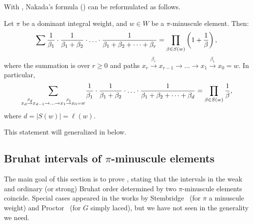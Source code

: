 With , Nakada's formula () can be reformulated as follows.
\begin{theorem}[Nakada]\label{thm:anotherform}
	Let $\pi$ be a dominant integral weight, and $w\in W$ be a $\pi$-minuscule element. Then: 
	\[ \sum \frac{1}{\beta_1}\cdot \frac{1}{\beta_1+\beta_2}\cdot \ldots \cdot\frac{1}{\beta_1+\beta_2+\cdots +\beta_r}
	=\prod_{\beta\in S(w)}\left(1+\frac{1}{\beta}\right) \/,
	\] where the summation is over $r \ge 0$ and paths $x_r\overset{\beta_r}{\to} x_{r-1}\to \ldots \to x_1\overset{\beta_1}{\to} x_0=w$.
	In particular, 
	$$
	{\sum_{x_d\overset{\beta_d}{\to} x_{d-1}\to \ldots \to x_1\overset{\beta_1}{\to} x_0=w\/}}
	\frac{1}{\beta_1}\cdot \frac{1}{\beta_1+\beta_2}\cdot \ldots \cdot \frac{1}{\beta_1+\beta_2+\cdots +\beta_d}
	=\prod_{\beta\in S(w)}\frac{1}{\beta},
	$$
	where $d=|S(w)|{= \ell(w)}$.
\end{theorem}
This statement will generalized in  below.

\subsection{Bruhat intervals of \texorpdfstring{$\pi$}{pi}-minuscule elements}\label{sec:minuscule-intervals}
The main goal of this section is to prove , stating that the intervals in the weak and ordinary (or strong) Bruhat
order determined by two $\pi$-minuscule elements coincide. Special cases appeared
in the works by Stembridge~\cite[Thm.~7.1]{stembridge:fullycomm} (for $\pi$ a minuscule weight) and Proctor~\cite[\S 10]{proctor:minuscule} (for $G$ simply laced),
but we have not seen  in the generality we need.

